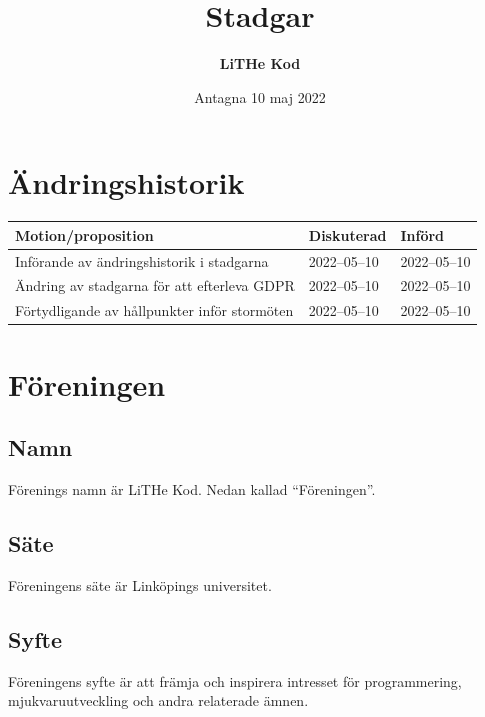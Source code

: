 \documentclass[11pt,a4paper]{article}
\title{\textbf{Stadgar}}
\date{Antagna 10 maj 2022}
\author{\textbf{LiTHe Kod}}
\begin{document}
\maketitle
\thispagestyle{empty}
\pagebreak
\tableofcontents
\pagebreak

\section*{Ändringshistorik}
\begin{tabularx}{\textwidth}{X l l}
    \bfseries Motion/proposition & \bfseries Diskuterad & \bfseries Införd \\\hline
    \vspace{-0.6em} %
    Införande av ändringshistorik i stadgarna & 2022--05--10 & 2022--05--10 \\
    Ändring av stadgarna för att efterleva GDPR & 2022--05--10 & 2022--05--10 \\
    Förtydligande av hållpunkter inför stormöten & 2022--05--10 & 2022--05--10 \\
\end{tabularx}
\pagebreak

\pagestyle{fancy}

\section{Föreningen}
\subsection{Namn}
Förenings namn är LiTHe Kod. Nedan kallad ``Föreningen''.
\subsection{Säte}
Föreningens säte är Linköpings universitet.
\subsection{Syfte}\label{sec:syfte}
Föreningens syfte är att främja och inspirera intresset för programmering, mjukvaruutveckling och andra relaterade ämnen.
\end{document}
